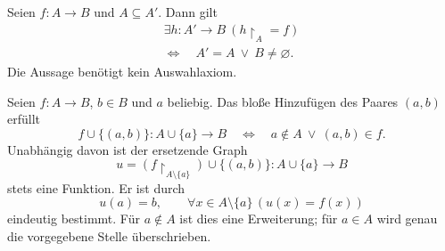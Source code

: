 \begin{theorem}
\label{b05guide:thm:extension-existence}
Seien $f\colon A\to B$ und $A\subseteq A'$. Dann gilt
\[
 \begin{gathered}
 \exists h\colon A'\to B\ (h\restriction_A=f)\\
 \Longleftrightarrow\quad A'=A\ \lor\ B\ne\varnothing.
 \end{gathered}
\]
Die Aussage benötigt kein Auswahlaxiom.
\end{theorem}

\begin{theorem}
\label{b05guide:thm:point-update}
Seien $f\colon A\to B$, $b\in B$ und $a$ beliebig.
Das bloße Hinzufügen des Paares $(a,b)$ erfüllt
\[
 f\cup\{(a,b)\}\colon A\cup\{a\}\to B
 \quad\Longleftrightarrow\quad
 a\notin A\ \lor\ (a,b)\in f.
\]
Unabhängig davon ist der ersetzende Graph
\[
 u=(f\restriction_{A\setminus\{a\}})\cup\{(a,b)\}
       \colon A\cup\{a\}\to B
\]
stets eine Funktion. Er ist durch
\[
 u(a)=b,\qquad
 \forall x\in A\setminus\{a\}\,(u(x)=f(x))
\]
eindeutig bestimmt. Für $a\notin A$ ist dies eine Erweiterung;
für $a\in A$ wird genau die vorgegebene Stelle überschrieben.
\end{theorem}
